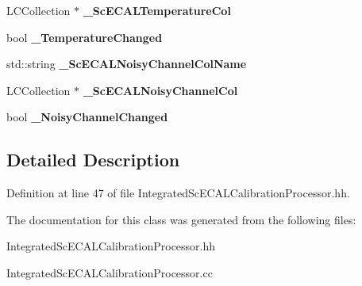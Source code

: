 \begin{DoxyCompactItemize}
\item 
L\-C\-Collection $\ast$ {\bfseries \-\_\-\-Sc\-E\-C\-A\-L\-Temperature\-Col}\label{classCALICE_1_1IntegratedScECALCalibrationProcessor_a48a9a574f0f7377f9e8dc16a99b7a45a}

\item 
bool {\bfseries \-\_\-\-Temperature\-Changed}\label{classCALICE_1_1IntegratedScECALCalibrationProcessor_ab2e5c24c94b27fd94a70bebb8a071aea}

\item 
std\-::string {\bfseries \-\_\-\-Sc\-E\-C\-A\-L\-Noisy\-Channel\-Col\-Name}\label{classCALICE_1_1IntegratedScECALCalibrationProcessor_a234c5e12f557aebf5752f95e53ca68a7}

\item 
L\-C\-Collection $\ast$ {\bfseries \-\_\-\-Sc\-E\-C\-A\-L\-Noisy\-Channel\-Col}\label{classCALICE_1_1IntegratedScECALCalibrationProcessor_aa04542cfddd279b2c0254916e9d830a2}

\item 
bool {\bfseries \-\_\-\-Noisy\-Channel\-Changed}\label{classCALICE_1_1IntegratedScECALCalibrationProcessor_a920d09ab58c742d08d16599ab661eae2}

\end{DoxyCompactItemize}


\subsection{Detailed Description}


Definition at line 47 of file Integrated\-Sc\-E\-C\-A\-L\-Calibration\-Processor.\-hh.



The documentation for this class was generated from the following files\-:\begin{DoxyCompactItemize}
\item 
Integrated\-Sc\-E\-C\-A\-L\-Calibration\-Processor.\-hh\item 
Integrated\-Sc\-E\-C\-A\-L\-Calibration\-Processor.\-cc\end{DoxyCompactItemize}
